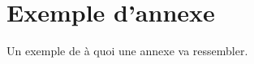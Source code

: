 \documentclass[../main.tex]{subfiles}
\begin{document}
\chapter{Exemple d'annexe
    \label{anx:exemple}}

Un exemple de à quoi une annexe va ressembler.
\end{document}
